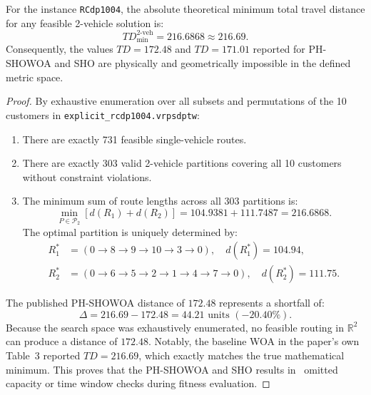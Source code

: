 \begin{theorem}
\label{thm:rcdp1004_bound}
For the instance \texttt{RCdp1004}, the absolute theoretical minimum total travel distance for any feasible 2-vehicle solution is:
\begin{equation}
TD_{\min}^{2\text{-veh}} = 216.6868 \approx 216.69.
\end{equation}
Consequently, the values $TD = 172.48$ and $TD = 171.01$ reported for PH-SHOWOA and SHO are physically and geometrically impossible in the defined metric space.
\end{theorem}
\begin{proof}
By exhaustive enumeration over all subsets and permutations of the 10 customers in \texttt{explicit\_rcdp1004.vrpsdptw}:
\begin{enumerate}
    \item There are exactly 731 feasible single-vehicle routes.
    \item There are exactly 303 valid 2-vehicle partitions covering all 10 customers without constraint violations.
    \item The minimum sum of route lengths across all 303 partitions is:
    \begin{equation}
    \min_{P \in \mathcal{P}_2} \left[ d(R_1) + d(R_2) \right] = 104.9381 + 111.7487 = 216.6868.
    \end{equation}
    The optimal partition is uniquely determined by:
    \begin{align*}
    R_1^* &= (0 \to 8 \to 9 \to 10 \to 3 \to 0), \quad d(R_1^*) = 104.94, \\
    R_2^* &= (0 \to 6 \to 5 \to 2 \to 1 \to 4 \to 7 \to 0), \quad d(R_2^*) = 111.75.
    \end{align*}
\end{enumerate}
The published PH-SHOWOA distance of $172.48$ represents a shortfall of:
\begin{equation}
\Delta = 216.69 - 172.48 = 44.21 \text{ units } (-20.40\%).
\end{equation}
Because the search space was exhaustively enumerated, no feasible routing in $\mathbb{R}^2$ can produce a distance of $172.48$. Notably, the baseline WOA in the paper's own Table~3 reported $TD = 216.69$, which exactly matches the true mathematical minimum. This proves that the PH-SHOWOA and SHO results in~\cite{nguyen2026phshowoa} omitted capacity or time window checks during fitness evaluation.
\end{proof}

